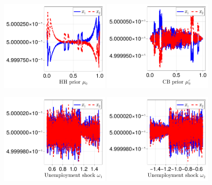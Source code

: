 \documentclass[12pt,a4paper]{article}
\begin{document}
\begin{figure}[H]
\centering
\includegraphics[width=0.49\textwidth]{figures/V9/γ_1/fig_optimal_x_μ_0.pdf}
\includegraphics[width=0.49\textwidth]{figures/V9/γ_1/fig_optimal_x_μ_0_c.pdf}
\end{figure}

\begin{figure}[H]
\centering
\includegraphics[width=0.49\textwidth]{figures/V9/γ_1/fig_optimal_x_ω_1.pdf}
\includegraphics[width=0.49\textwidth]{figures/V9/γ_1/fig_optimal_x_ω_2.pdf}
\end{figure}
\end{document}
